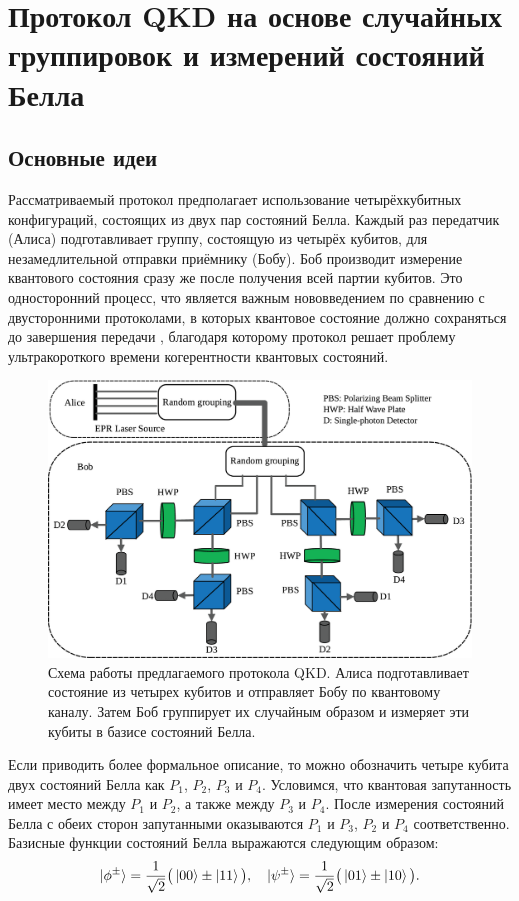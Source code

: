 \documentclass[a4paper,11pt]{article}
\begin{document}
\section{Протокол QKD на основе случайных группировок и измерений состояний Белла}\label{proto}

\subsection{Основные идеи}
Рассматриваемый протокол предполагает использование четырёхкубитных конфигураций, состоящих из двух пар состояний Белла. Каждый раз передатчик (Алиса) подготавливает группу, состоящую из четырёх кубитов, для незамедлительной отправки приёмнику (Бобу). Боб производит измерение квантового состояния сразу же после получения всей партии кубитов. Это односторонний процесс, что является важным нововведением по сравнению с двусторонними протоколами, в которых квантовое состояние должно сохраняться до завершения передачи \cite{Gao,nine}, благодаря которому протокол решает проблему ультракороткого времени когерентности квантовых состояний.

\begin{figure}[h!]
	\centering    
	\includegraphics[width=0.64\columnwidth]{scheme.png}
	\caption{Схема работы предлагаемого протокола QKD. Алиса подготавливает состояние из четырех кубитов и отправляет Бобу по квантовому каналу. Затем Боб группирует их случайным образом и измеряет эти кубиты в базисе состояний Белла.}
	\label{im1}
\end{figure}

Если приводить более формальное описание, то можно обозначить четыре кубита двух состояний Белла как $P_1$, $P_2$, $P_3$ и $P_4$. Условимся, что квантовая запутанность имеет место между $P_1$ и $P_2$, а также между $P_3$ и $P_4$. После измерения состояний Белла с обеих сторон запутанными оказываются $P_1$ и $P_3$, $P_2$ и $P_4$ соответственно. Базисные функции состояний Белла выражаются следующим образом:
\begin{equation*}
\ket{\phi^{\pm}} = \dfrac{1}{\sqrt2}\big(\ket{00} \pm \ket{11} \big), \quad
\ket{\psi^{\pm}} = \dfrac{1}{\sqrt2}\big(\ket{01} \pm \ket{10} \big).
\end{equation*}
\end{document}
